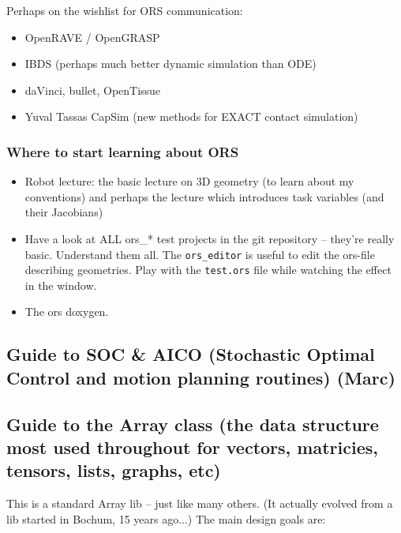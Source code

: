 Perhaps on the wishlist for ORS communication:
\begin{itemize}
\item OpenRAVE /  OpenGRASP

\item IBDS (perhaps much better dynamic simulation than ODE)

\item daVinci, bullet, OpenTissue

\item Yuval Tassas CapSim (new methods for EXACT contact simulation)
\end{itemize}

\subsubsection{Where to start learning about ORS}

\begin{itemize}
\item Robot lecture: the basic lecture on 3D geometry (to learn about my
conventions) and perhaps the lecture which introduces task variables
(and their Jacobians)

\item Have a look at ALL ors\_* test projects in the git repository --
they're really basic. Understand them all. The \verb+ors_editor+ is useful to
edit the ors-file describing geometries. Play with the \verb+test.ors+ file
while watching the effect in the window.

\item The ors doxygen.
\end{itemize}



\subsection{Guide to SOC \& AICO (Stochastic Optimal Control and motion
   planning routines) (Marc)}



\subsection{Guide to the Array class (the data structure most used throughout
   for vectors, matricies, tensors, lists, graphs, etc)}

This is a standard Array lib -- just like many others. (It actually
evolved from a lib started in Bochum, 15 years ago...) The main design
goals are: 

